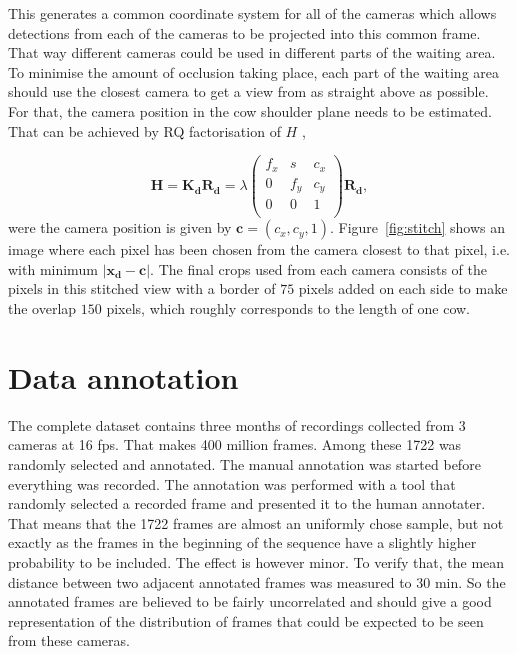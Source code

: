\documentclass{cta-author}
\begin{document}
This generates a common coordinate system for all of the cameras which allows detections from each of the 
cameras to be projected into this common frame. That way different cameras could be used in different parts 
of the waiting area. To minimise the amount of occlusion taking place, each part of the waiting area should 
use the closest camera to get a view from as straight above as possible. For that, the camera position in the 
cow shoulder plane needs to be estimated. That can be achieved by RQ factorisation of $H$ \cite{Hartley2004}, 

\begin{equation}
\bm H = \bm {K_d} \bm {R_d} = 
    \lambda
	\left(
	\begin{array}{ccc}
		f_x & s & c_x  \\
		0 & f_y & c_y  \\
		0 & 0 & 1  \\
	\end{array}
	\right)
	\bm {R_d} ,
\end{equation}
were the camera position is given by $\bm c = \left(c_x, c_y, 1\right)$. Figure~\ref{fig:stitch} shows an 
image where each pixel has been chosen from the camera closest to that pixel, i.e. with  minimum $\left| \bm 
{x_d} - \bm c \right|$. The final crops used from each camera consists of the pixels in this stitched view 
with a border of $75$ pixels added on each side to make the overlap $150$ pixels, which roughly corresponds 
to the length of one cow.


\section{Data annotation}

The complete dataset contains three months of recordings collected from 3 cameras at 16 fps. That makes 400 
million frames. Among these 1722 was randomly selected and annotated. The manual annotation was started 
before everything was recorded. The annotation was performed with a tool that randomly selected a recorded 
frame and presented it to the human annotater. That means that the 1722 frames are almost an uniformly chose 
sample, but not exactly as the frames in the beginning of the sequence have a slightly higher probability to 
be included. The effect is however minor. To verify that, 
the mean distance between two adjacent annotated frames was measured to 30 min. So the annotated frames are 
believed to be fairly uncorrelated and should give a good representation of the distribution of frames that 
could be expected to be seen from these cameras.
\end{document}
